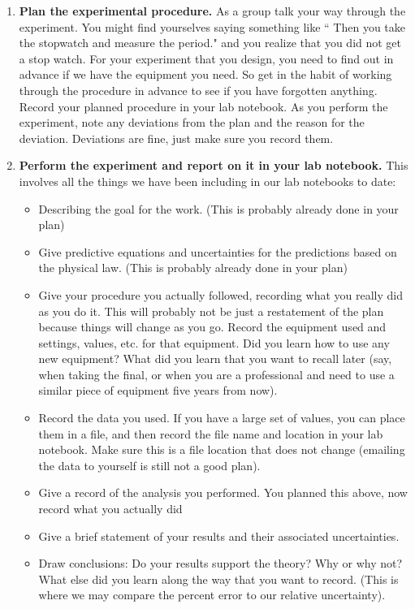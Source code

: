 \documentclass[twoside,11pt,ShortChapTitles]{BYUTextbook}
\begin{document}
\begin{enumerate}
\item {\bf Plan the experimental procedure.} As a group talk your way through the
experiment. You might find yourselves saying something like ``
Then you take the stopwatch and measure the period." and
you realize that you did not get a stop watch. For your experiment that you
design, you need to find out in advance if we have the equipment you need. So
get in the habit of working through the procedure in advance to see if you
have forgotten anything. Record your planned procedure in your lab notebook.
As you perform the experiment, note any deviations from the plan and the
reason for the deviation. Deviations are fine, just make sure you record them.

\item {\bf Perform the experiment and report on it in your lab notebook.} This
involves all the things we have been including in our lab notebooks to date:


\begin{itemize}
\item Describing the goal for the work. (This is probably already done in your plan)

\item Give predictive equations and uncertainties for the predictions based on
the physical law. (This is probably already done in your plan)

\item Give your procedure you actually followed, recording what you really did
as you do it. This will probably not be just a restatement of the plan because
things will change as you go. Record the equipment used and settings, values,
etc. for that equipment. Did you learn how to use any new equipment? What did
you learn that you want to recall later (say, when taking the final, or when
you are a professional and need to use a similar piece of equipment five years
from now).

\item Record the data you used. If you have a large set of values, you can
place them in a file, and then record the file name and location in your lab
notebook. Make sure this is a file location that does not change (emailing the
data to yourself is still not a good plan).

\item Give a record of the analysis you performed. You planned this above, now
record what you actually did

\item Give a brief statement of your results and their associated uncertainties.

\item Draw conclusions: Do your results support the theory? Why or why not?
What else did you learn along the way that you want to record. (This is where
we may compare the percent error to our relative uncertainty).
\end{itemize}
\end{enumerate}
\end{document}
